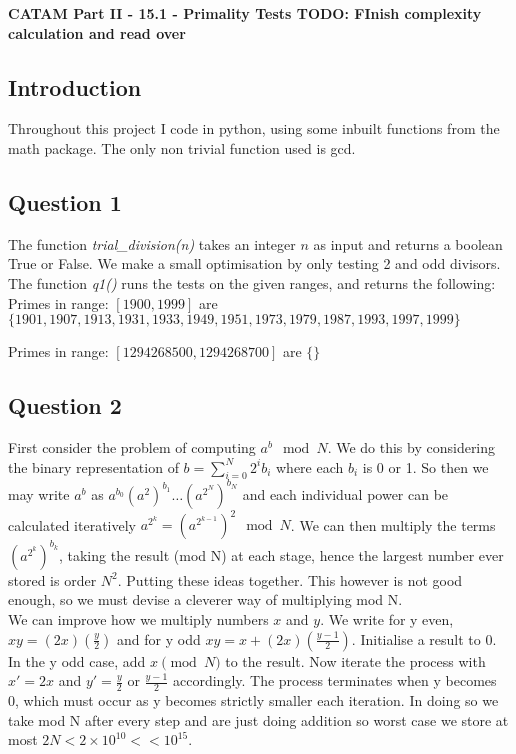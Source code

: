 \documentclass[10pt,a4paper]{report}
\begin{document}
\textbf{CATAM Part II - 15.1 - Primality Tests TODO: FInish complexity calculation and read over}
\thispagestyle{empty}

\newpage

\subsection*{Introduction}

Throughout this project I code in python, using some inbuilt functions from the math package. The only non trivial function used is gcd.

\subsection*{Question 1}


The function \textit{trial\_division(n)} takes an integer $n$ as input and returns a boolean True or False. We make a small optimisation by only testing 2 and odd divisors. The function \textit{q1()} runs the tests on the given ranges, and returns the following:\\

Primes in range: $[1900, 1999]$ are  $\{1901, 1907, 1913, 1931, 1933   ,1949, 1951, 1973, 1979, 1987, 1993, 1997, 1999\}$

Primes in range: $ [1294268500, 1294268700]$ are $\{\}$

\subsection*{Question 2}

First consider the problem of computing $a^b \mod{N}$. We do this by considering the binary representation of $b = \sum_{i=0}^N 2^i b_i$ where each $b_i$ is 0 or 1. So then we may write $a^b$ as $a^{b_0} (a^2)^{b_1} \ldots (a^{2^N})^{b_N}$ and each individual power  can be calculated iteratively $a^{2^k} =  (a^{2^{k-1}})^2  \mod N$. We can then multiply the terms $(a^{2^k})^{b_k}$, taking the result (mod N) at each stage, hence the largest number ever stored is order $N^2$. Putting these ideas together. This however is not good enough, so we must devise a cleverer way of multiplying mod N.\\

We can improve how we multiply numbers $x$ and $y$. We write for y even, $xy = (2x)(\frac{y}{2})$ and for y odd $xy = x+ (2x)(\frac{y-1}{2})$. Initialise a result to 0. In the y odd case, add $x \pmod{N}$ to the result. Now iterate the process with $x'=2x$ and $y'=\frac{y}{2}$ or $\frac{y-1}{2}$ accordingly. The process terminates when y becomes 0, which must occur as y becomes strictly smaller each iteration. In doing so we take mod N after every step and are just doing addition so worst case we store at most $2N < 2\times 10^{10} << 10^{15}$.\\
\end{document}

